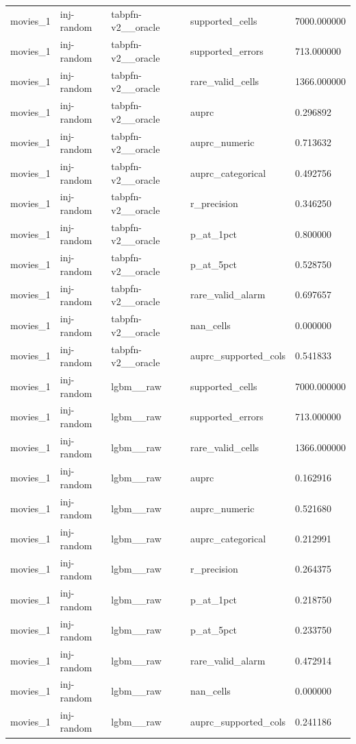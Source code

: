 \begin{tabular}{lllll}
movies\_1 & inj-random & tabpfn-v2\_\_oracle & supported\_cells & 7000.000000 \\
movies\_1 & inj-random & tabpfn-v2\_\_oracle & supported\_errors & 713.000000 \\
movies\_1 & inj-random & tabpfn-v2\_\_oracle & rare\_valid\_cells & 1366.000000 \\
movies\_1 & inj-random & tabpfn-v2\_\_oracle & auprc & 0.296892 \\
movies\_1 & inj-random & tabpfn-v2\_\_oracle & auprc\_numeric & 0.713632 \\
movies\_1 & inj-random & tabpfn-v2\_\_oracle & auprc\_categorical & 0.492756 \\
movies\_1 & inj-random & tabpfn-v2\_\_oracle & r\_precision & 0.346250 \\
movies\_1 & inj-random & tabpfn-v2\_\_oracle & p\_at\_1pct & 0.800000 \\
movies\_1 & inj-random & tabpfn-v2\_\_oracle & p\_at\_5pct & 0.528750 \\
movies\_1 & inj-random & tabpfn-v2\_\_oracle & rare\_valid\_alarm & 0.697657 \\
movies\_1 & inj-random & tabpfn-v2\_\_oracle & nan\_cells & 0.000000 \\
movies\_1 & inj-random & tabpfn-v2\_\_oracle & auprc\_supported\_cols & 0.541833 \\
movies\_1 & inj-random & lgbm\_\_raw & supported\_cells & 7000.000000 \\
movies\_1 & inj-random & lgbm\_\_raw & supported\_errors & 713.000000 \\
movies\_1 & inj-random & lgbm\_\_raw & rare\_valid\_cells & 1366.000000 \\
movies\_1 & inj-random & lgbm\_\_raw & auprc & 0.162916 \\
movies\_1 & inj-random & lgbm\_\_raw & auprc\_numeric & 0.521680 \\
movies\_1 & inj-random & lgbm\_\_raw & auprc\_categorical & 0.212991 \\
movies\_1 & inj-random & lgbm\_\_raw & r\_precision & 0.264375 \\
movies\_1 & inj-random & lgbm\_\_raw & p\_at\_1pct & 0.218750 \\
movies\_1 & inj-random & lgbm\_\_raw & p\_at\_5pct & 0.233750 \\
movies\_1 & inj-random & lgbm\_\_raw & rare\_valid\_alarm & 0.472914 \\
movies\_1 & inj-random & lgbm\_\_raw & nan\_cells & 0.000000 \\
movies\_1 & inj-random & lgbm\_\_raw & auprc\_supported\_cols & 0.241186 \\

\end{tabular}
